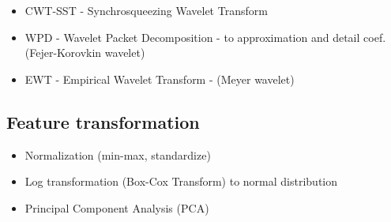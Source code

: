 \begin{itemize}
\item CWT-SST - Synchrosqueezing Wavelet Transform
	\cite{arts_fast_2022}
	\cite{yu_concentrated_2020}
	\cite{herrera_applications_2014}

\item WPD - Wavelet Packet Decomposition  - to approximation and detail coef. (Fejer-Korovkin wavelet)
	\cite{yen_wavelet_2000}
	\cite{wickmann_wavelet_2007}
	\cite{song_mfbd_2021}

\item EWT - Empirical Wavelet Transform - (Meyer wavelet)
	\cite{wang_computational_2014}
	\cite{tiwari_novel_2021}
	\cite{song_mfbd_2021}
	\cite{li_fault_2019}
	\cite{zhuang_improved_2020}
	\cite{yonggang_time_2020}
	\cite{xu_adaptive_2019}
	\cite{ni_improved_2022}
\end{itemize}


\subsection{Feature transformation}
\cite{zheng_feature_2018}
\begin{itemize}
\item Normalization (min-max, standardize)
\item Log transformation (Box-Cox Transform) to normal distribution
\item Principal Component Analysis (PCA)  %
\end{itemize}

